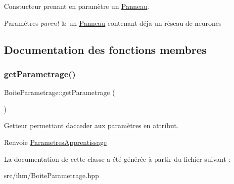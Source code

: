 Constucteur prenant en paramètre un \hyperlink{class_panneau}{Panneau}. 


\begin{DoxyParams}{Paramètres}
{\em parent} & un \hyperlink{class_panneau}{Panneau} contenant déja un réseau de neurones \\
\hline
\end{DoxyParams}


\subsection{Documentation des fonctions membres}
\mbox{\label{class_boite_parametrage_ad7c3de61949e05469a73e6b8369205e2}} 
\subsubsection{\texorpdfstring{get\+Parametrage()}{getParametrage()}}
{\footnotesize\ttfamily Boite\+Parametrage\+::get\+Parametrage (\begin{DoxyParamCaption}{ }\end{DoxyParamCaption})}



Getteur permettant d\textquotesingle{}acceder aux paramètres en attribut. 

\begin{DoxyReturn}{Renvoie}
\hyperlink{class_parametres_apprentissage}{Parametres\+Apprentissage} 
\end{DoxyReturn}


La documentation de cette classe a été générée à partir du fichier suivant \+:\begin{DoxyCompactItemize}
\item 
src/ihm/Boite\+Parametrage.\+hpp\end{DoxyCompactItemize}
